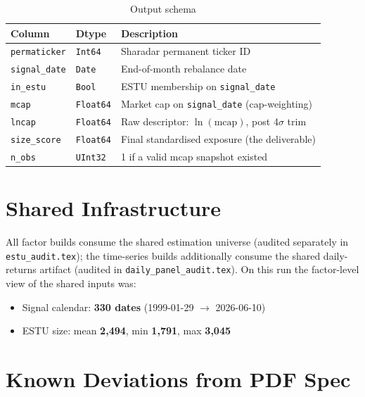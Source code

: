 \documentclass[11pt,a4paper]{article}
\begin{document}
\begin{table}[h!]
\centering
\caption{Output schema}
\begin{tabular}{llp{7.4cm}}
\toprule
\textbf{Column} & \textbf{Dtype} & \textbf{Description} \\
\midrule
\texttt{permaticker} & \texttt{Int64} & Sharadar permanent ticker ID \\
\texttt{signal\_date} & \texttt{Date} & End-of-month rebalance date \\
\texttt{in\_estu} & \texttt{Bool} & ESTU membership on \texttt{signal\_date} \\
\texttt{mcap} & \texttt{Float64} & Market cap on \texttt{signal\_date} (cap-weighting) \\
\texttt{lncap} & \texttt{Float64} & Raw descriptor: $\ln(\text{mcap})$, post 4$\sigma$ trim \\
\texttt{size\_score} & \texttt{Float64} & Final standardised exposure (the deliverable) \\
\texttt{n\_obs} & \texttt{UInt32} & 1 if a valid mcap snapshot existed \\
\bottomrule
\end{tabular}
\end{table}

\section{Shared Infrastructure}

All factor builds consume the shared estimation universe
 (audited separately in
\texttt{estu\_audit.tex}); the time-series builds additionally consume the
shared daily-returns artifact (audited in \texttt{daily\_panel\_audit.tex}).
On this run the factor-level view of the shared inputs was:

\begin{itemize}[leftmargin=*,topsep=2pt,itemsep=2pt]
  \item Signal calendar: \textbf{330 dates} (1999-01-29 $\to$ 2026-06-10)
  \item ESTU size: mean \textbf{2{,}494}, min \textbf{1{,}791}, max \textbf{3{,}045}
\end{itemize}

\section{Known Deviations from PDF Spec}
\end{document}
